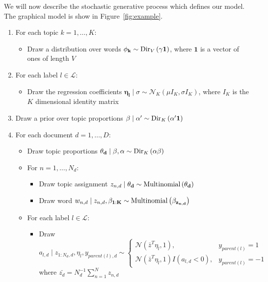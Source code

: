 We will now describe the stochastic generative process which defines
our model. The graphical model is show in Figure~\ref{fig:example}.

\begin{enumerate}
\item For each topic $k=1,\ldots,K$: 

\begin{itemize}
\item Draw a distribution over words $\mathbf{\phi_{k}}\sim{\rm Dir}_{V}\left(\gamma\mathbf{1}\right)$,
where $\mathbf{1}$ is a vector of ones of length $V$ 
\end{itemize}
\item For each label $l\in\mathcal{L}$: 

\begin{itemize}
\item Draw the regression coefficients $\mathbf{\eta_{l}}\mid\sigma\sim\mathcal{N}_{K}\left(\mu I_{K},\sigma I_{K}\right)$,
where $I_{K}$ is the $K$ dimensional identity matrix 
\end{itemize}
\item Draw a prior over topic proportions $\mathbf{\beta}\mid\alpha'\sim{\rm Dir}_{K}\left(\alpha^{\prime}\mathbf{1}\right)$
\item For each document $d=1,\ldots,D$: 

\begin{itemize}
\item Draw topic proportions $\mathbf{\theta_{d}}\mid\beta,\alpha\sim{\rm Dir}_{K}\left(\alpha\mathbf{\beta}\right)$ 
\item For $n=1,\ldots,N_{d}$: 

\begin{itemize}
\item Draw topic assignment $z_{n,d}\mid\mathbf{\theta_{d}}\sim{\rm Multinomial}\left(\mathbf{\theta_{d}}\right)$ 
\item Draw word $w_{n,d}\mid z_{n,d},\mathbf{\beta_{1:K}}\sim{\rm Multinomial}\left(\mathbf{\beta_{z_{n,d}}}\right)$ 
\end{itemize}
\item For each label $l\in\mathcal{L}$: 

\begin{itemize}
\item Draw $a_{l,d}\mid z_{1:N_{d},d},\eta_{l},y_{parent(l),d}\sim\begin{cases}
\mathcal{N}\left(\bar{z}^{T}\eta_{l},1\right), & y_{parent(l)}=1\\
\mathcal{N}\left(\bar{z}^{T}\eta_{l},1\right)I\left(a_{l,d}<0\right), & y_{parent(l)}=-1\end{cases}$ where $\bar{z_{d}}=N_{d}^{-1}\sum_{n=1}^{N}z_{n,d}$ %
 

\end{itemize}
\end{itemize}
\end{enumerate}
